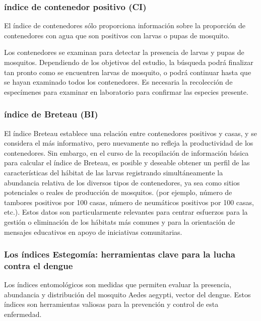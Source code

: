 \documentclass[
  letterpaper,
]{scrbook}
\begin{document}
\subsubsection{índice de contenedor positivo
(CI)}\label{uxedndice-de-contenedor-positivo-ci}

El índice de contenedores sólo proporciona información sobre la
proporción de contenedores con agua que son positivos con larvas o pupas
de mosquito.

Los contenedores se examinan para detectar la presencia de larvas y
pupas de mosquitos. Dependiendo de los objetivos del estudio, la
búsqueda podrá finalizar tan pronto como se encuentren larvas de
mosquito, o podrá continuar hasta que se hayan examinado todos los
contenedores. Es necesaria la recolección de especímenes para examinar
en laboratorio para confirmar las especies presente.

\subsubsection{índice de Breteau (BI)}\label{uxedndice-de-breteau-bi}

El índice Breteau establece una relación entre contenedores positivos y
casas, y se considera el más informativo, pero nuevamente no refleja la
productividad de los contenedores. Sin embargo, en el curso de la
recopilación de información básica para calcular el índice de Breteau,
es posible y deseable obtener un perfil de las características del
hábitat de las larvas registrando simultáneamente la abundancia relativa
de los diversos tipos de contenedores, ya sea como sitios potenciales o
reales de producción de mosquitos. (por ejemplo, número de tambores
positivos por 100 casas, número de neumáticos positivos por 100 casas,
etc.). Estos datos son particularmente relevantes para centrar esfuerzos
para la gestión o eliminación de los hábitats más comunes y para la
orientación de mensajes educativos en apoyo de iniciativas comunitarias.

\subsubsection{Los índices Estegomía: herramientas clave para la lucha
contra el
dengue}\label{los-uxedndices-estegomuxeda-herramientas-clave-para-la-lucha-contra-el-dengue}

Los índices entomológicos son medidas que permiten evaluar la presencia,
abundancia y distribución del mosquito Aedes aegypti, vector del dengue.
Estos índices son herramientas valiosas para la prevención y control de
esta enfermedad.
\end{document}
